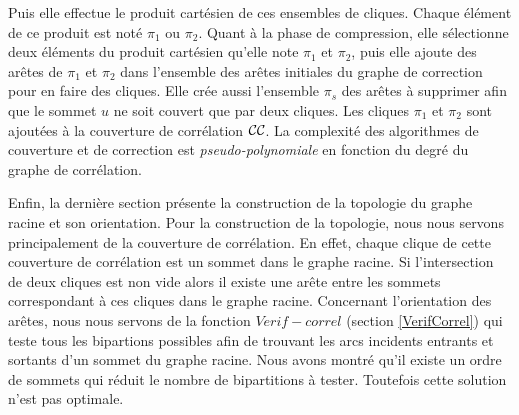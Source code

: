 Puis elle effectue le produit cart\'esien de ces ensembles de cliques. Chaque \'el\'ement de ce produit est not\'e $\pi_1$ ou $\pi_2$.
Quant \`a la phase de compression, elle s\'electionne deux \'el\'ements du produit cart\'esien qu'elle note  $\pi_1$ et $\pi_2$, puis elle ajoute des ar\^etes de  $\pi_1$ et $\pi_2$ dans l'ensemble des ar\^etes initiales du graphe de correction pour en faire des cliques. Elle cr\'ee aussi l'ensemble $\pi_s$ des ar\^etes \`a supprimer afin que le sommet $u$ ne soit couvert que par deux cliques. 
Les cliques $\pi_1$ et $\pi_2$ sont ajout\'ees \`a la couverture de corr\'elation $\cal CC$. 
La complexit\'e des algorithmes de couverture et de correction est {\em pseudo-polynomiale} en fonction du degr\'e du graphe de corr\'elation. 
\newline 

Enfin, la derni\`ere section pr\'esente la construction de la topologie du graphe racine et son orientation. Pour la construction de la topologie, nous nous servons principalement de la couverture de corr\'elation. En effet, chaque clique de cette couverture de corr\'elation est un sommet dans le graphe racine. Si l'intersection de deux cliques est non vide alors il existe une ar\^ete entre les sommets correspondant \`a ces cliques dans le graphe racine. 
Concernant l'orientation des ar\^etes, nous nous servons de la fonction $Verif-correl$ (section \ref{VerifCorrel}) qui teste tous les bipartions possibles afin de trouvant les arcs incidents entrants et sortants d'un sommet du graphe racine. Nous avons montr\'e qu'il existe un ordre de sommets qui r\'eduit le nombre de bipartitions \`a tester. Toutefois cette solution n'est pas optimale. 




